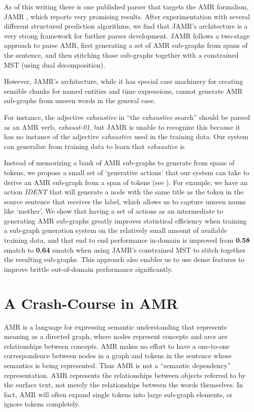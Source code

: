 \documentclass[11pt]{article}
\begin{document}
As of this writing there is one published parser that targets the AMR formalism, JAMR \cite{Flanigan:14}, which reports very promising results. After experimentation with several different structured prediction algorithms, we find that JAMR's architecture is a very strong framework for further parser development. JAMR follows a two-stage approach to parse AMR, first generating a set of AMR sub-graphs from spans of the sentence, and then stitching those sub-graphs together with a constrained MST (using dual decomposition).

However, JAMR's architecture, while it has special case machinery for creating sensible chunks for named entities and time expressions, cannot generate AMR sub-graphs from unseen words in the general case. 


For instance, the adjective \textit{exhaustive} in ``the \textit{exhaustive} search'' should be parsed as an AMR verb, \textit{exhaust-01}, but JAMR is unable to recognize this because it has no instance of the adjective \textit{exhaustive} used in the training data. Our system can generalize from training data to learn that \textit{exhaustive} is 

Instead of memorizing a bank of AMR sub-graphs to generate from spans of tokens, we propose a small set of `generative actions' that our system can take to derive an AMR sub-graph from a span of tokens (see ). For example, we have an action \textit{IDENT} that will generate a node with the same title as the token in the source sentence that receives the label, which allows us to capture unseen nouns like `mother'. We show that having a set of actions as an intermediate to generating AMR sub-graphs greatly improves statistical efficiency when training a sub-graph generation system on the relatively small amount of available training data, and that end to end performance in-domain is improved from \textbf{0.58} smatch to \textbf{0.64} smatch when using JAMR's constrained MST to stitch together the resulting sub-graphs. This approach also enables us to use dense features to improve brittle out-of-domain performance significantly.

\section{A Crash-Course in AMR}

AMR is a language for expressing semantic understanding that represents meaning as a directed graph, where nodes represent concepts and arcs are relationships between concepts. AMR makes no effort to have a one-to-one correspondence between nodes in a graph and tokens in the sentence whose semantics is being represented. Thus AMR is not a ``semantic dependency'' representation. AMR represents the relationships between objects referred to by the surface text, not merely the relationships between the words themselves. In fact, AMR will often expand single tokens into large sub-graph elements, or ignore tokens completely.
\end{document}
